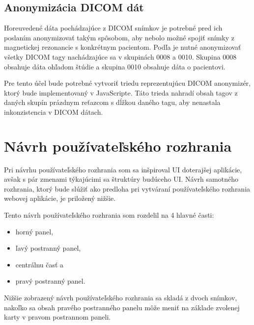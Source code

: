 
\subsection {Anonymizácia DICOM dát}
Horeuvedené dáta pochádzajúce z DICOM snímkov je potrebné pred ich poslaním anonymizovať takým spôsobom, aby nebolo možné spojiť snímky z magnetickej rezonancie s konkrétnym pacientom. Podľa \cite{Varma_2012} je nutné anonymizovať všetky DICOM tagy nachádzajúce sa v skupinách 0008 a 0010. Skupina 0008 obsahuje dáta ohľadom štúdie a skupina 0010 obsahuje dáta o pacientovi.

Pre tento účel bude potrebné vytvoriť triedu reprezentujúcu DICOM anonymizér, ktorý bude implementovaný v JavaScripte. Táto trieda nahradí obsah tagov z daných skupín prázdnym reťazcom s dĺžkou daného tagu, aby nenastala inkonzistencia v DICOM dátach.

\section {Návrh používateľského rozhrania}
Pri návrhu používateľského rozhrania som sa inšpiroval UI doterajšej aplikácie, avšak s pár zmenami týkajúcimi sa štruktúry budúceho UI. Návrh samotného rozhrania, ktorý bude slúžiť ako predloha pri vytváraní používateľského rozhrania webovej aplikácie, je priložený nižšie. 

Tento návrh používateľského rozhrania som rozdelil na 4 hlavné časti:
\begin {itemize}
\item {horný panel,}
\item {ľavý postranný panel,}
\item {centrálnu časť a}
\item {pravý postranný panel.}
\end {itemize}

Nižšie zobrazený návrh používateľského rozhrania sa skladá z dvoch snímkov, nakoľko sa obsah pravého postranného panelu môže meniť na základe zvolenej karty v pravom postrannom paneli.

